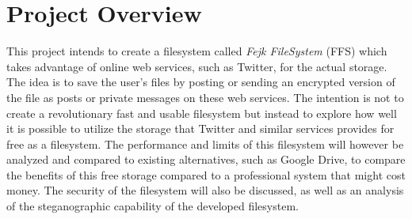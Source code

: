\section{Project Overview}

This project intends to create a filesystem called \textit{Fejk FileSystem} (FFS) which takes advantage of online web services, such as Twitter, for the actual storage. The idea is to save the user's files by posting or sending an encrypted version of the file as posts or private messages on these web services. The intention is not to create a revolutionary fast and usable filesystem but instead to explore how well it is possible to utilize the storage that Twitter and similar services provides for free as a filesystem. The performance and limits of this filesystem will however be analyzed and compared to existing alternatives, such as Google Drive, to compare the benefits of this free storage compared to a professional system that might cost money. The security of the filesystem will also be discussed, as well as an analysis of the steganographic capability of the developed filesystem.